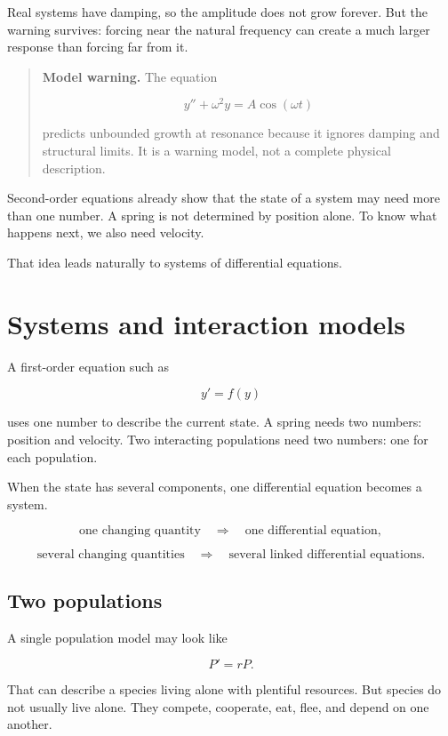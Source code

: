 Real systems have damping, so the amplitude does not grow forever.  But the warning
survives: forcing near the natural frequency can create a much larger response than
forcing far from it.

\begin{quote}
\textbf{Model warning.}
The equation

\[
y''+\omega^2y=A\cos(\omega t)
\]

predicts unbounded growth at resonance because it ignores damping and structural
limits.  It is a warning model, not a complete physical description.
\end{quote}

Second-order equations already show that the state of a system may need more than one
number.  A spring is not determined by position alone.  To know what happens next, we
also need velocity.

That idea leads naturally to systems of differential equations.

\section{Systems and interaction models}
\label{sec:systems-interaction-models}

A first-order equation such as

\[
y'=f(y)
\]

uses one number to describe the current state.  A spring needs two numbers: position and
velocity.  Two interacting populations need two numbers: one for each population.

When the state has several components, one differential equation becomes a system.

\[
\text{one changing quantity}
\quad\Longrightarrow\quad
\text{one differential equation},
\]

\[
\text{several changing quantities}
\quad\Longrightarrow\quad
\text{several linked differential equations}.
\]

\subsection{Two populations}
\label{subsec:two-populations}

A single population model may look like

\[
P'=rP.
\]

That can describe a species living alone with plentiful resources.  But species do not
usually live alone.  They compete, cooperate, eat, flee, and depend on one another.

